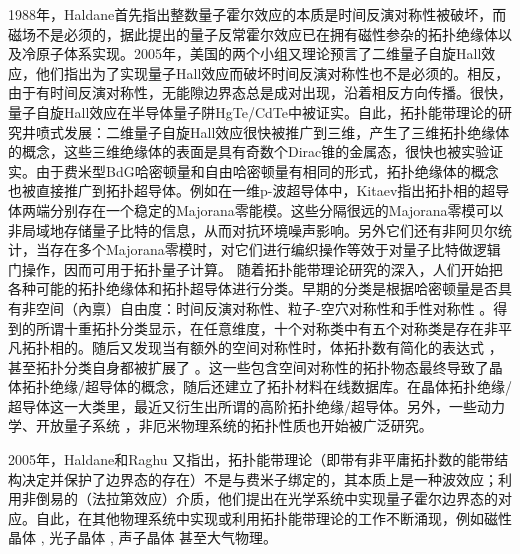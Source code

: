 1988年，Haldane首先指出整数量子霍尔效应的本质是时间反演对称性被破坏，而磁场不是必须的\cite{Haldane1988}，据此提出的量子反常霍尔效应已在拥有磁性参杂的拓扑绝缘体\cite{Chang2013}以及冷原子体系\cite{Jotzu2014}实现。2005年，美国的两个小组又理论预言了二维量子自旋Hall效应\cite{Kane2005,Bernevig2006a}，他们指出为了实现量子Hall效应而破坏时间反演对称性也不是必须的。相反，由于有时间反演对称性，无能隙边界态总是成对出现，沿着相反方向传播。很快，量子自旋Hall效应在半导体量子阱HgTe/CdTe中被证实\cite{Bernevig2006}。自此，拓扑能带理论的研究井喷式发展：二维量子自旋Hall效应很快被推广到三维，产生了三维拓扑绝缘体的概念\cite{Moore2007,Fu2007a,Roy2009}，这些三维绝缘体的表面是具有奇数个Dirac锥的金属态，很快也被实验证实\cite{Hsieh2008}。由于费米型BdG哈密顿量和自由哈密顿量有相同的形式，拓扑绝缘体的概念也被直接推广到拓扑超导体。例如在一维p-波超导体中，Kitaev指出拓扑相的超导体两端分别存在一个稳定的Majorana零能模\cite{Kitaev2001}。这些分隔很远的Majorana零模可以非局域地存储量子比特的信息，从而对抗环境噪声影响。另外它们还有非阿贝尔统计\cite{Ivanov2001}，当存在多个Majorana零模时，对它们进行编织操作等效于对量子比特做逻辑门操作，因而可用于拓扑量子计算\cite{Pachos2014}。
随着拓扑能带理论研究的深入，人们开始把各种可能的拓扑绝缘体和拓扑超导体进行分类。早期的分类是根据哈密顿量是否具有非空间（內禀）自由度：时间反演对称性、粒子-空穴对称性和手性对称性 \cite{Altland1997,Zirnbauer2018}。得到的所谓十重拓扑分类显示，在任意维度，十个对称类中有五个对称类是存在非平凡拓扑相的。随后又发现当有额外的空间对称性时，体拓扑数有简化的表达式 \cite{Fu2007}，甚至拓扑分类自身都被扩展了 \cite{Fu2011}。这一些包含空间对称性的拓扑物态最终导致了晶体拓扑绝缘/超导体的概念\cite{Ando2015}，随后还建立了拓扑材料在线数据库\cite{vergniory2019complete,zhang2019catalogue,tang2019comprehensive}。在晶体拓扑绝缘/超导体这一大类里，最近又衍生出所谓的高阶拓扑绝缘/超导体\cite{Benalcazar2017,Langbehn2017,Benalcazar2017a,Schindler2018}。另外，一些动力学\cite{Chang2018,Yang2018,Gong2018,Qiu2018}、开放量子系统 \cite{Shen2018,Kawabata2018,Kawabata2019,Song2019}，非厄米物理系统\cite{Yao2018a,Yao2018,Xiao2020}的拓扑性质也开始被广泛研究。

2005年，Haldane和Raghu \cite{Raghu2008,Haldane2008}又指出，拓扑能带理论（即带有非平庸拓扑数的能带结构决定并保护了边界态的存在）不是与费米子绑定的，其本质上是一种波效应；利用非倒易的（法拉第效应）介质，他们提出在光学系统中实现量子霍尔边界态的对应。自此，在其他物理系统中实现或利用拓扑能带理论的工作不断涌现，例如磁性晶体 \cite{Shindou2013,Chisnell2015,Kondo2019}, 光子晶体 \cite{Wang2008,Rechtsman2013,Peano2016}, 声子晶体 \cite{Fleury2014,SafaviNaeini2014,Peano2015} 甚至大气物理\cite{Delplace2017}。

